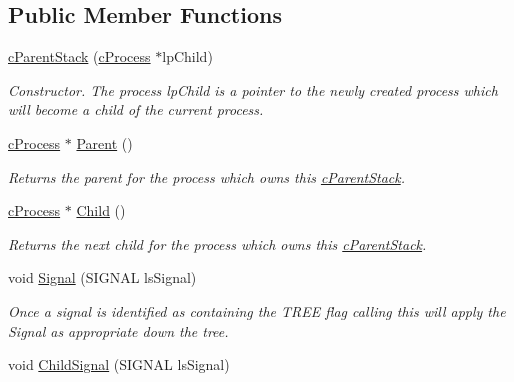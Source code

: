 \subsection*{Public Member Functions}
\begin{DoxyCompactItemize}
\item 
\hypertarget{classc_parent_stack_a5a85e5a848beec2b9f1f706120c62da0}{
\hyperlink{classc_parent_stack_a5a85e5a848beec2b9f1f706120c62da0}{cParentStack} (\hyperlink{classc_process}{cProcess} $\ast$lpChild)}
\label{classc_parent_stack_a5a85e5a848beec2b9f1f706120c62da0}

\begin{DoxyCompactList}\small\item\em Constructor. The process lpChild is a pointer to the newly created process which will become a child of the current process. \end{DoxyCompactList}\item 
\hypertarget{classc_parent_stack_a4b2f2e5f79bf471864f3657acde58e1f}{
\hyperlink{classc_process}{cProcess} $\ast$ \hyperlink{classc_parent_stack_a4b2f2e5f79bf471864f3657acde58e1f}{Parent} ()}
\label{classc_parent_stack_a4b2f2e5f79bf471864f3657acde58e1f}

\begin{DoxyCompactList}\small\item\em Returns the parent for the process which owns this \hyperlink{classc_parent_stack}{cParentStack}. \end{DoxyCompactList}\item 
\hypertarget{classc_parent_stack_a33044759a96875172b5d21b260323cdb}{
\hyperlink{classc_process}{cProcess} $\ast$ \hyperlink{classc_parent_stack_a33044759a96875172b5d21b260323cdb}{Child} ()}
\label{classc_parent_stack_a33044759a96875172b5d21b260323cdb}

\begin{DoxyCompactList}\small\item\em Returns the next child for the process which owns this \hyperlink{classc_parent_stack}{cParentStack}. \end{DoxyCompactList}\item 
\hypertarget{classc_parent_stack_a8c197500963dfbbb0b4dd04abe2b249c}{
void \hyperlink{classc_parent_stack_a8c197500963dfbbb0b4dd04abe2b249c}{Signal} (SIGNAL lsSignal)}
\label{classc_parent_stack_a8c197500963dfbbb0b4dd04abe2b249c}

\begin{DoxyCompactList}\small\item\em Once a signal is identified as containing the TREE flag calling this will apply the Signal as appropriate down the tree. \end{DoxyCompactList}\item 
\hypertarget{classc_parent_stack_ae983b483bbfe6863c70759a61ffb2d3e}{
void \hyperlink{classc_parent_stack_ae983b483bbfe6863c70759a61ffb2d3e}{ChildSignal} (SIGNAL lsSignal)}
\label{classc_parent_stack_ae983b483bbfe6863c70759a61ffb2d3e}


\end{DoxyCompactItemize}
